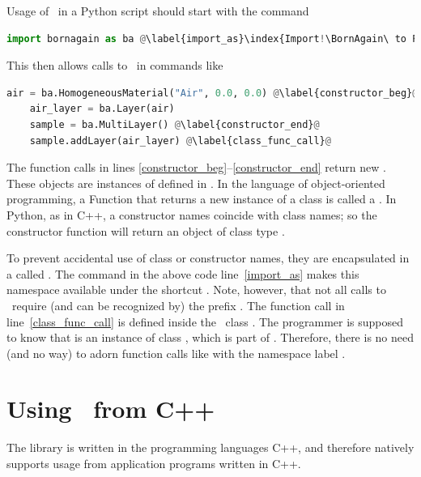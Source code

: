 Usage of \BornAgain\ in a Python script should start with the command
\begin{lstlisting}[language=python, style=eclipseboxed,name=ex1,nolol]
import bornagain as ba @\label{import_as}\index{Import!\BornAgain\ to Python|(}@
\end{lstlisting}
This then allows calls to \BornAgain\ in commands like
\begin{lstlisting}[language=python, style=eclipseboxed,name=ex1,nolol]
    air = ba.HomogeneousMaterial("Air", 0.0, 0.0) @\label{constructor_beg}@
    air_layer = ba.Layer(air)
    sample = ba.MultiLayer() @\label{constructor_end}@
    sample.addLayer(air_layer) @\label{class_func_call}@
\end{lstlisting}
The function calls in lines \ref{constructor_beg}--\ref{constructor_end}
return new .
These objects are instances of  defined in \BornAgain.
In the language of object-oriented programming,
a Function that returns a new instance of a class is called a .
In Python, as in C++, a constructor names coincide with class names;
so the constructor function  will return an
object of class type .

To prevent accidental use of class or constructor names,
they are encapsulated in a 
called .
The  command in the above code line~\ref{import_as}
makes this namespace available under the shortcut .
Note, however, that not all calls to \BornAgain\ require
(and can be recognized by) the prefix .
The function call  in line~\ref{class_func_call}
is defined inside the \BornAgain\ class .
The programmer is supposed to know that  is an instance of
class , which is part of \BornAgain.
Therefore, there is no need (and no way) to adorn function calls like 
with the namespace label .



\section{Using \BornAgain\ from C++}

The library 
%
%
is written in the programming languages C++,
and therefore natively supports usage from application programs written in C++.

